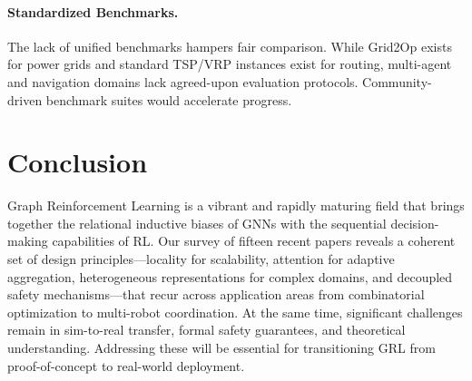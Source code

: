\documentclass{article}
\begin{document}
\paragraph{Standardized Benchmarks.}
The lack of unified benchmarks hampers fair comparison. While Grid2Op exists for power grids and standard TSP/VRP instances exist for routing, multi-agent and navigation domains lack agreed-upon evaluation protocols. Community-driven benchmark suites would accelerate progress.

\section{Conclusion}

Graph Reinforcement Learning is a vibrant and rapidly maturing field that brings together the relational inductive biases of GNNs with the sequential decision-making capabilities of RL. Our survey of fifteen recent papers reveals a coherent set of design principles---locality for scalability, attention for adaptive aggregation, heterogeneous representations for complex domains, and decoupled safety mechanisms---that recur across application areas from combinatorial optimization to multi-robot coordination. At the same time, significant challenges remain in sim-to-real transfer, formal safety guarantees, and theoretical understanding. Addressing these will be essential for transitioning GRL from proof-of-concept to real-world deployment.


\end{document}
